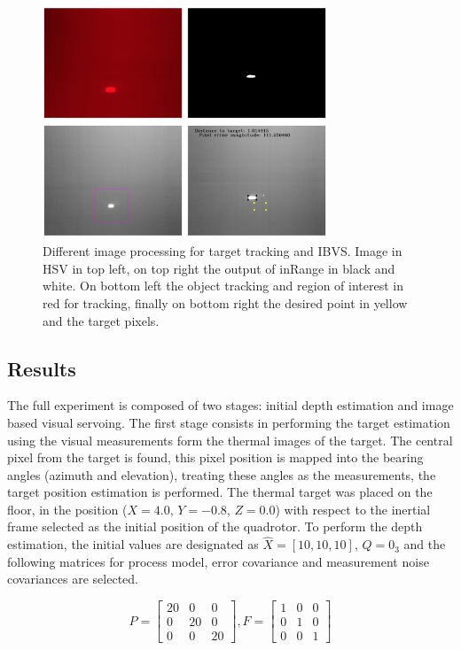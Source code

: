 \documentclass[conference]{IEEEtran}
\begin{document}
\begin{figure}
\centering
\includegraphics[width=8.5cm, height=7cm]{Images/image_proc.jpg}
\caption{Different image processing for target tracking and IBVS. Image in HSV in top left, on top right the output of inRange in black and white. On bottom left the object tracking and region of interest in red for tracking, finally on bottom right the desired point in yellow and the target pixels.}
\label{img_proc}
\end{figure}

\subsection{Results}
The full experiment is composed of two stages: initial depth estimation and image based visual servoing. The first stage consists in performing the target estimation using the visual measurements form the thermal images of the target. The central pixel from the target is found, this pixel position is mapped into the bearing angles (azimuth and elevation), treating these angles as the measurements, the target position estimation is performed. The thermal target was placed on the floor, in the position ($X=4.0$, $Y=-0.8$, $Z=0.0$) with respect to the inertial frame selected as the initial position of the quadrotor. To perform the depth estimation, the initial values are designated as $\hat{X} = \left[10, 10, 10\right]$, $Q = 0_{3}$ and the following matrices for process model, error covariance and measurement noise covariances are selected.

\begin{equation*}
P = \begin{bmatrix} 20 & 0 &  0\\
                    0 &20 &  0\\
                    0 & 0 & 20 \end{bmatrix},
F = \begin{bmatrix}  1 & 0 &  0\\
                    0 & 1 &  0\\
                    0 & 0 &  1 \end{bmatrix}
\end{equation*}
\end{document}
